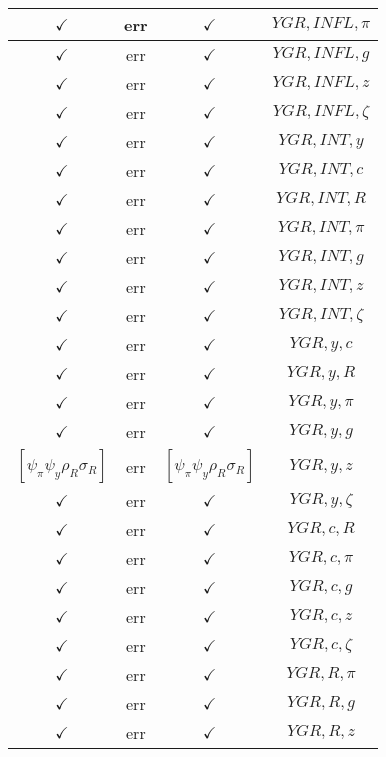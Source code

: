 \documentclass[a4paper,10pt]{article}
\begin{document}
\begin{longtable}{|c|c|c|c|}
\hline
$\checkmark$ & err & $\checkmark$ & ${YGR},{INFL},{\pi}$ \\
\hline
$\checkmark$ & err & $\checkmark$ & ${YGR},{INFL},{g}$ \\
\hline
$\checkmark$ & err & $\checkmark$ & ${YGR},{INFL},{z}$ \\
\hline
$\checkmark$ & err & $\checkmark$ & ${YGR},{INFL},{\zeta}$ \\
\hline
$\checkmark$ & err & $\checkmark$ & ${YGR},{INT},{y}$ \\
\hline
$\checkmark$ & err & $\checkmark$ & ${YGR},{INT},{c}$ \\
\hline
$\checkmark$ & err & $\checkmark$ & ${YGR},{INT},{R}$ \\
\hline
$\checkmark$ & err & $\checkmark$ & ${YGR},{INT},{\pi}$ \\
\hline
$\checkmark$ & err & $\checkmark$ & ${YGR},{INT},{g}$ \\
\hline
$\checkmark$ & err & $\checkmark$ & ${YGR},{INT},{z}$ \\
\hline
$\checkmark$ & err & $\checkmark$ & ${YGR},{INT},{\zeta}$ \\
\hline
$\checkmark$ & err & $\checkmark$ & ${YGR},{y},{c}$ \\
\hline
$\checkmark$ & err & $\checkmark$ & ${YGR},{y},{R}$ \\
\hline
$\checkmark$ & err & $\checkmark$ & ${YGR},{y},{\pi}$ \\
\hline
$\checkmark$ & err & $\checkmark$ & ${YGR},{y},{g}$ \\
\hline
$[\psi_\pi \psi_y \rho_R \sigma_R ]$ & err & $[\psi_\pi \psi_y \rho_R \sigma_R ]$ & ${YGR},{y},{z}$ \\
\hline
$\checkmark$ & err & $\checkmark$ & ${YGR},{y},{\zeta}$ \\
\hline
$\checkmark$ & err & $\checkmark$ & ${YGR},{c},{R}$ \\
\hline
$\checkmark$ & err & $\checkmark$ & ${YGR},{c},{\pi}$ \\
\hline
$\checkmark$ & err & $\checkmark$ & ${YGR},{c},{g}$ \\
\hline
$\checkmark$ & err & $\checkmark$ & ${YGR},{c},{z}$ \\
\hline
$\checkmark$ & err & $\checkmark$ & ${YGR},{c},{\zeta}$ \\
\hline
$\checkmark$ & err & $\checkmark$ & ${YGR},{R},{\pi}$ \\
\hline
$\checkmark$ & err & $\checkmark$ & ${YGR},{R},{g}$ \\
\hline
$\checkmark$ & err & $\checkmark$ & ${YGR},{R},{z}$ \\

\end{longtable}
\end{document}
